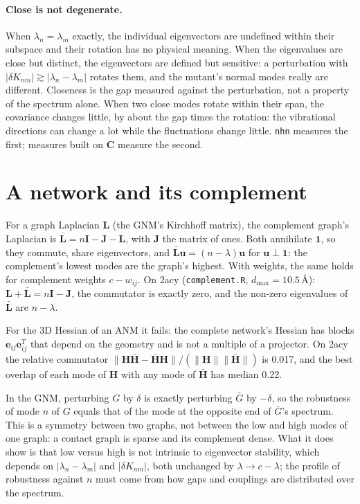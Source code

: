 \documentclass[11pt]{article}
\newcommand{\uu}{\mathbf{u}}
\newcommand{\CC}{\mathbf{C}}
\newcommand{\code}[1]{\texttt{#1}}
\begin{document}
\paragraph{Close is not degenerate.} When $\lambda_n=\lambda_m$ exactly, the individual eigenvectors are
undefined within their subspace and their rotation has no physical meaning. When the eigenvalues are
close but distinct, the eigenvectors are defined but sensitive: a perturbation with
$|\delta K_{nm}|\gtrsim|\lambda_n-\lambda_m|$ rotates them, and the mutant's normal modes really are
different. Closeness is the gap measured against the perturbation, not a property of the spectrum
alone. When two close modes rotate within their span, the covariance changes little, by about the
gap times the rotation: the vibrational directions can change a lot while the fluctuations change
little. \code{nhn} measures the first; measures built on $\CC$ measure the second.

\section{A network and its complement}

For a graph Laplacian $\mathbf{L}$ (the GNM's Kirchhoff matrix), the complement graph's Laplacian is
$\bar{\mathbf{L}} = n\mathbf{I}-\mathbf{J}-\mathbf{L}$, with $\mathbf{J}$ the matrix of ones.
Both annihilate $\mathbf{1}$, so they commute, share eigenvectors, and $\bar{\mathbf{L}}\uu=(n-\lambda)\uu$
for $\uu\perp\mathbf{1}$: the complement's lowest modes are the graph's highest.
With weights, the same holds for complement weights $c-w_{ij}$.
On 2acy (\code{complement.R}, $d_{\max}=10.5$\,\AA): $\mathbf{L}+\bar{\mathbf{L}}=n\mathbf{I}-\mathbf{J}$,
the commutator is exactly zero, and the non-zero eigenvalues of $\bar{\mathbf{L}}$ are $n-\lambda$.

For the 3D Hessian of an ANM it fails: the complete network's Hessian has blocks
$\mathbf{e}_{ij}\mathbf{e}_{ij}^T$ that depend on the geometry and is not a multiple of a
projector. On 2acy the relative commutator $\|\mathbf{H}\bar{\mathbf{H}}-\bar{\mathbf{H}}\mathbf{H}\|/(\|\mathbf{H}\|\|\bar{\mathbf{H}}\|)$
is 0.017, and the best overlap of each mode of $\mathbf{H}$ with any mode of $\bar{\mathbf{H}}$ has median 0.22.

In the GNM, perturbing $G$ by $\delta$ is exactly perturbing $\bar G$ by $-\delta$, so the
robustness of mode $n$ of $G$ equals that of the mode at the opposite end of $\bar G$'s spectrum.
This is a symmetry between two graphs, not between the low and high modes of one graph: a
contact graph is sparse and its complement dense. What it does show is that low versus high is
not intrinsic to eigenvector stability, which depends on $|\lambda_n-\lambda_m|$ and $|\delta K_{nm}|$,
both unchanged by $\lambda\to c-\lambda$; the profile of robustness against $n$ must come from how gaps
and couplings are distributed over the spectrum.
\end{document}
